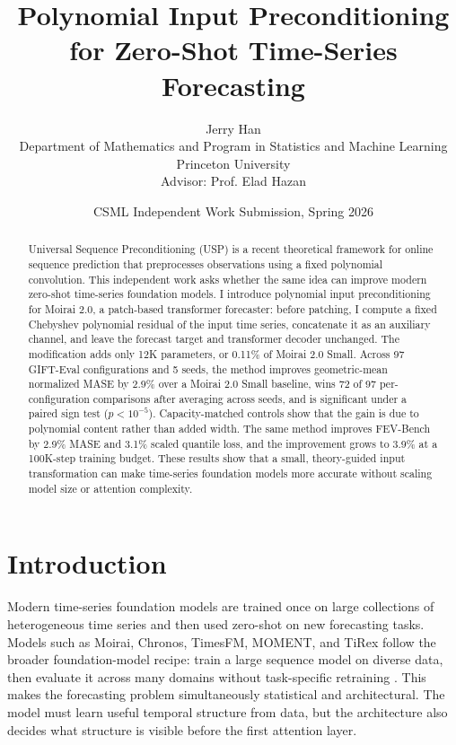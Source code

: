 \documentclass[11pt]{article}
\title{\vspace{-0.35in}Polynomial Input Preconditioning for Zero-Shot Time-Series Forecasting}
\author{Jerry Han\\
Department of Mathematics and Program in Statistics and Machine Learning\\
Princeton University\\
Advisor: Prof. Elad Hazan}
\date{CSML Independent Work Submission, Spring 2026}
\begin{document}
\maketitle

\begin{abstract}
Universal Sequence Preconditioning (USP) is a recent theoretical framework for online sequence prediction that preprocesses observations using a fixed polynomial convolution. This independent work asks whether the same idea can improve modern zero-shot time-series foundation models. I introduce polynomial input preconditioning for Moirai 2.0, a patch-based transformer forecaster: before patching, I compute a fixed Chebyshev polynomial residual of the input time series, concatenate it as an auxiliary channel, and leave the forecast target and transformer decoder unchanged. The modification adds only 12K parameters, or 0.11\% of Moirai 2.0 Small. Across 97 GIFT-Eval configurations and 5 seeds, the method improves geometric-mean normalized MASE by 2.9\% over a Moirai 2.0 Small baseline, wins 72 of 97 per-configuration comparisons after averaging across seeds, and is significant under a paired sign test ($p<10^{-5}$). Capacity-matched controls show that the gain is due to polynomial content rather than added width. The same method improves FEV-Bench by 2.9\% MASE and 3.1\% scaled quantile loss, and the improvement grows to 3.9\% at a 100K-step training budget. These results show that a small, theory-guided input transformation can make time-series foundation models more accurate without scaling model size or attention complexity.
\end{abstract}

\section{Introduction}

Modern time-series foundation models are trained once on large collections of heterogeneous time series and then used zero-shot on new forecasting tasks. Models such as Moirai, Chronos, TimesFM, MOMENT, and TiRex follow the broader foundation-model recipe: train a large sequence model on diverse data, then evaluate it across many domains without task-specific retraining \citep{woo2024unified,liu2024moirai2,das2024decoder,ansari2024chronos,goswami2024moment,auer2025tirex}. This makes the forecasting problem simultaneously statistical and architectural. The model must learn useful temporal structure from data, but the architecture also decides what structure is visible before the first attention layer.
\end{document}
